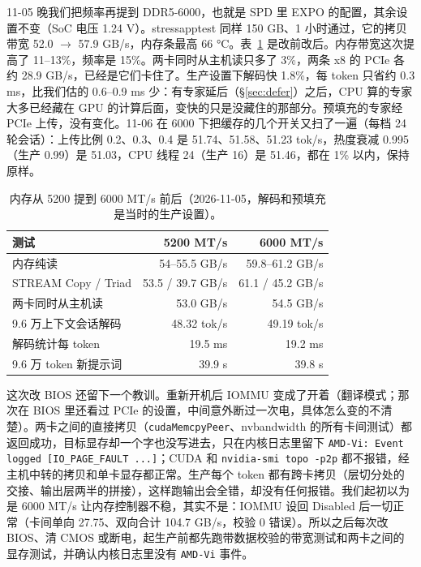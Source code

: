 \documentclass[11pt,a4paper]{article}
\newcommand{\code}[1]{\texttt{#1}}
\newcommand{\tps}{tok/s}
\begin{document}
11-05 晚我们把频率再提到 DDR5-6000，也就是 SPD 里 EXPO 的配置，其余设置不变（SoC 电压 1.24 V）。stressapptest 同样 150 GB、1 小时通过，它的拷贝带宽 52.0 $\to$ 57.9 GB/s，内存条最高 66 °C。表~\ref{tab:ddr6000} 是改前改后。内存带宽这次提高了 11--13\%，频率是 15\%。两卡同时从主机读只多了 3\%，两条 x8 的 PCIe 各约 28.9 GB/s，已经是它们卡住了。生产设置下解码快 1.8\%，每 token 只省约 0.3 ms，比我们估的 0.6--0.9 ms 少：有专家延后（\S\ref{sec:defer}）之后，CPU 算的专家大多已经藏在 GPU 的计算后面，变快的只是没藏住的那部分。预填充的专家经 PCIe 上传，没有变化。11-06 在 6000 下把缓存的几个开关又扫了一遍（每档 24 轮会话）：上传比例 0.2、0.3、0.4 是 51.74、51.58、51.23 \tps{}，热度衰减 0.995（生产 0.99）是 51.03，CPU 线程 24（生产 16）是 51.46，都在 1\% 以内，保持原样。

\begin{table}[h]
  \centering
  \small
  \caption{内存从 5200 提到 6000 MT/s 前后（2026-11-05，解码和预填充是当时的生产设置）。}
  \label{tab:ddr6000}
  \begin{tabular}{@{}l r r@{}}
    \toprule
    测试 & 5200 MT/s & 6000 MT/s \\
    \midrule
    内存纯读 & 54--55.5 GB/s & 59.8--61.2 GB/s \\
    STREAM Copy / Triad & 53.5 / 39.7 GB/s & 61.1 / 45.2 GB/s \\
    两卡同时从主机读 & 53.0 GB/s & 54.5 GB/s \\
    9.6 万上下文会话解码 & 48.32 \tps{} & 49.19 \tps{} \\
    解码统计每 token & 19.5 ms & 19.2 ms \\
    9.6 万 token 新提示词 & 39.9 s & 39.8 s \\
    \bottomrule
  \end{tabular}
\end{table}

这次改 BIOS 还留下一个教训。重新开机后 IOMMU 变成了开着（翻译模式；那次在 BIOS 里还看过 PCIe 的设置，中间意外断过一次电，具体怎么变的不清楚）。两卡之间的直接拷贝（\code{cudaMemcpyPeer}、nvbandwidth 的所有卡间测试）都返回成功，目标显存却一个字也没写进去，只在内核日志里留下 \code{AMD-Vi: Event logged [IO\_PAGE\_FAULT ...]}；CUDA 和 \code{nvidia-smi topo -p2p} 都不报错，经主机中转的拷贝和单卡显存都正常。生产每个 token 都有跨卡拷贝（层切分处的交接、输出层两半的拼接），这样跑输出会全错，却没有任何报错。我们起初以为是 6000 MT/s 让内存控制器不稳，其实不是：IOMMU 设回 Disabled 后一切正常（卡间单向 27.75、双向合计 104.7 GB/s，校验 0 错误）。所以之后每次改 BIOS、清 CMOS 或断电，起生产前都先跑带数据校验的带宽测试和两卡之间的显存测试，并确认内核日志里没有 \code{AMD-Vi} 事件。
\end{document}
